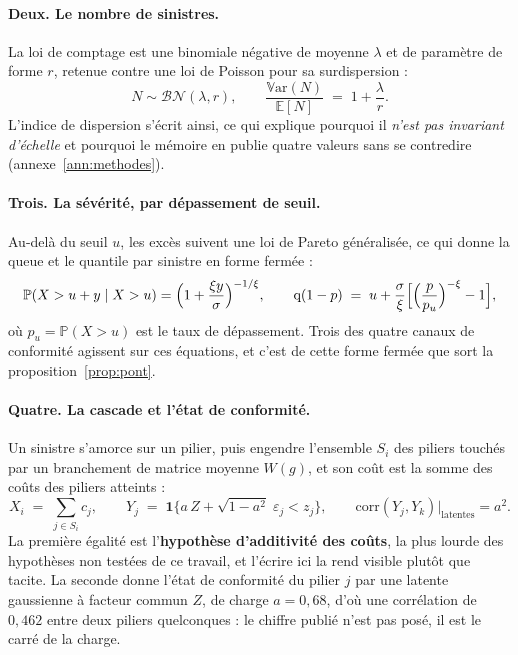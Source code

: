 \documentclass[12pt,a4paper]{article}
\theoremstyle{definition}
\begin{document}
\paragraph{Deux. Le nombre de sinistres.} La loi de comptage est une binomiale
négative de moyenne $\lambda$ et de paramètre de forme $r$, retenue contre une loi
de Poisson pour sa surdispersion :
\begin{equation}
  N \sim \mathcal{BN}(\lambda, r),
  \qquad
  \frac{\mathbb{V}\mathrm{ar}(N)}{\mathbb{E}[N]} \;=\; 1 + \frac{\lambda}{r}.
  \label{eq:frequence}
\end{equation}
L'indice de dispersion s'écrit ainsi, ce qui explique pourquoi il \emph{n'est pas
invariant d'échelle} et pourquoi le mémoire en publie quatre valeurs sans se
contredire (annexe~\ref{ann:methodes}).

\paragraph{Trois. La sévérité, par dépassement de seuil.} Au-delà du seuil $u$, les
excès suivent une loi de Pareto généralisée, ce qui donne la queue et le quantile
par sinistre en forme fermée :
\begin{equation}
  \mathbb{P}(X > u + y \mid X > u) = \Bigl(1 + \frac{\xi y}{\sigma}\Bigr)^{-1/\xi},
  \qquad
  \mathrm{q}(1-p) \;=\; u + \frac{\sigma}{\xi}
  \Bigl[\Bigl(\frac{p}{p_u}\Bigr)^{-\xi} - 1\Bigr],
  \label{eq:severite}
\end{equation}
où $p_u = \mathbb{P}(X > u)$ est le taux de dépassement. Trois des quatre canaux de
conformité agissent sur ces équations, et c'est de cette forme fermée que sort la
proposition~\ref{prop:pont}.

\paragraph{Quatre. La cascade et l'état de conformité.} Un sinistre s'amorce sur un
pilier, puis engendre l'ensemble $S_i$ des piliers touchés par un branchement de
matrice moyenne $W(g)$, et son coût est la somme des coûts des piliers atteints :
\begin{equation}
  X_i \;=\; \sum_{j \in S_i} c_j,
  \qquad
  Y_j \;=\; \mathbf{1}\bigl\{a\,Z + \sqrt{1-a^2}\;\varepsilon_j < z_j\bigr\},
  \qquad
  \mathrm{corr}(Y_j, Y_k)\big|_{\text{latentes}} = a^2.
  \label{eq:cascade}
\end{equation}
La première égalité est l'\textbf{hypothèse d'additivité des coûts}, la plus lourde
des hypothèses non testées de ce travail, et l'écrire ici la rend visible plutôt
que tacite. La seconde donne l'état de conformité du pilier $j$ par une latente
gaussienne à facteur commun $Z$, de charge $a = 0{,}68$, d'où une corrélation de
$0{,}462$ entre deux piliers quelconques : le chiffre publié n'est pas posé, il est
le carré de la charge.
\end{document}

